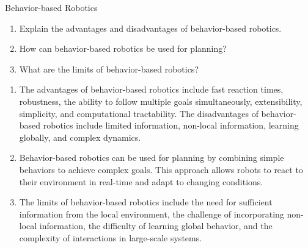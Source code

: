 \documentclass{article}
\begin{document}
\begin{exercise}{Behavior-based Robotics}
  \begin{enumerate}
    \item Explain the advantages and disadvantages of behavior-based robotics.
    \item How can behavior-based robotics be used for planning?
    \item What are the limits of behavior-based robotics?
  \end{enumerate}

  \begin{solution}
    \begin{enumerate}
      \item The advantages of behavior-based robotics include fast reaction times, robustness, the ability to follow multiple goals simultaneously, extensibility, simplicity, and computational tractability. The disadvantages of behavior-based robotics include limited information, non-local information, learning globally, and complex dynamics.
      \item Behavior-based robotics can be used for planning by combining simple behaviors to achieve complex goals. This approach allows robots to react to their environment in real-time and adapt to changing conditions.
      \item The limits of behavior-based robotics include the need for sufficient information from the local environment, the challenge of incorporating non-local information, the difficulty of learning global behavior, and the complexity of interactions in large-scale systems.
    \end{enumerate}
  \end{solution}
\end{exercise}
\end{document}
